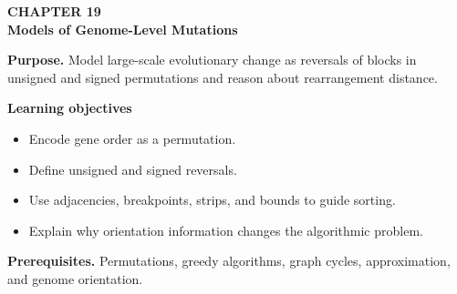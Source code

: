 \documentclass[11pt]{article}
\begin{document}
\begin{tcolorbox}[
  enhanced,breakable,colback=Primary!4,colframe=Primary,boxrule=0.9pt,
  arc=2mm,left=3mm,right=3mm,top=2.5mm,bottom=2.5mm]
{\sffamily\color{Accent}\bfseries CHAPTER 19}\\[-1pt]
{\sffamily\LARGE\bfseries\color{Primary} Models of Genome-Level Mutations}

\vspace{2pt}
\textbf{Purpose.} Model large-scale evolutionary change as reversals of blocks in unsigned and signed permutations and reason about rearrangement distance.

\textbf{Learning objectives}
\begin{itemize}
  \item Encode gene order as a permutation.
  \item Define unsigned and signed reversals.
  \item Use adjacencies, breakpoints, strips, and bounds to guide sorting.
  \item Explain why orientation information changes the algorithmic problem.
\end{itemize}

\textbf{Prerequisites.} Permutations, greedy algorithms, graph cycles, approximation, and genome orientation.
\end{tcolorbox}
\end{document}
